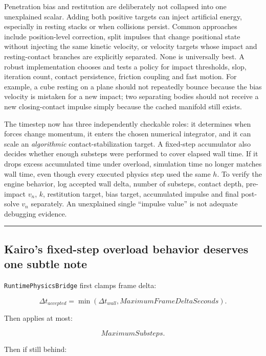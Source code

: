 Penetration bias and restitution are deliberately not collapsed into one unexplained scalar. Adding both positive targets can inject artificial energy, especially in resting stacks or when collisions persist. Common approaches include position-level correction, split impulses that change positional state without injecting the same kinetic velocity, or velocity targets whose impact and resting-contact branches are explicitly separated. None is universally best. A robust implementation chooses and tests a policy for impact thresholds, slop, iteration count, contact persistence, friction coupling and fast motion. For example, a cube resting on a plane should not repeatedly bounce because the bias velocity is mistaken for a new impact; two separating bodies should not receive a new closing-contact impulse simply because the cached manifold still exists.

The timestep now has three independently checkable roles: it determines when forces change momentum, it enters the chosen numerical integrator, and it can scale an \emph{algorithmic} contact-stabilization target. A fixed-step accumulator also decides whether enough substeps were performed to cover elapsed wall time. If it drops excess accumulated time under overload, simulation time no longer matches wall time, even though every executed physics step used the same \(h\). To verify the engine behavior, log accepted wall delta, number of substeps, contact depth, pre-impact \(v_n\), \(k\), restitution target, bias target, accumulated impulse and final post-solve \(v_n\) separately. An unexplained single ``impulse value'' is not adequate debugging evidence.

\begin{center}\rule{0.5\linewidth}{0.5pt}\end{center}

\subsection{Kairo's fixed-step overload behavior deserves one subtle note}\label{06-engine-ii-ch038-kairos-fixed-step-overload-behavior-deserves-one-subtle-note}

\texttt{RuntimePhysicsBridge} first clamps frame delta:

\[
\Delta t_{accepted}
=
\min(
\Delta t_{wall},
MaximumFrameDeltaSeconds).
\]

Then applies at most:

\[
MaximumSubsteps.
\]

Then if still behind:

